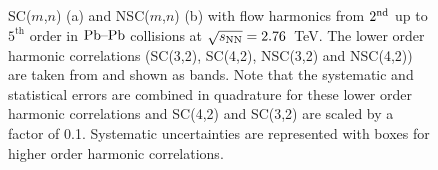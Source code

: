 \begin{figure}[h]
            \begin{center}
        \caption{SC($m$,$n$) (a) and NSC($m$,$n$) (b) with flow harmonics from $2^{\rm nd}$ up to $5^{\mathrm{th}}$ order in $\textnormal{Pb--Pb}$ collisions at $\sqrt{s_{\textnormal{NN}}}=2.76$~TeV. The lower order harmonic correlations (SC(3,2), SC(4,2), NSC(3,2) and NSC(4,2)) are taken from \cite{ALICE:2016kpq} and shown as bands. Note that the systematic and statistical errors are combined in quadrature for these lower order harmonic correlations and SC(4,2) and SC(3,2) are scaled by a factor of 0.1. Systematic uncertainties are represented with boxes for higher order harmonic correlations.}
        \label{fig:Figure_1}
              \end{center}
\end{figure}

